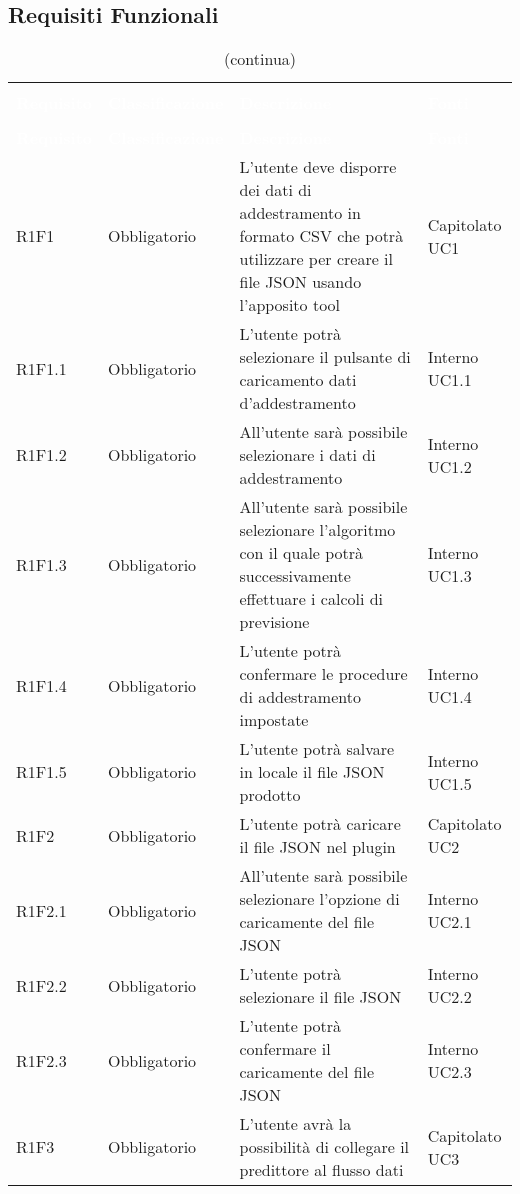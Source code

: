 \subsection{Requisiti Funzionali}
\begin{longtable}{C{3cm} C{3cm} L{5.5cm} C{3cm}}
\caption{Tabella dei requisiti funzionali} \\
\textcolor{white}{\textbf{Requisito}} &
\textcolor{white}{\textbf{Classificazione}} &
\textcolor{white}{\textbf{Descrizione}} &
\textcolor{white}{\textbf{Fonti}}  \\
		\endfirsthead
		\caption[]{(continua)} \\
\textcolor{white}{\textbf{Requisito}} &
\textcolor{white}{\textbf{Classificazione}} &
\textcolor{white}{\textbf{Descrizione}} &
\textcolor{white}{\textbf{Fonti}}  \\
		\endhead
R1F1 & Obbligatorio & L’utente deve disporre dei dati di addestramento in formato CSV che potrà utilizzare  per creare il file JSON usando l’apposito tool & Capitolato UC1\\
R1F1.1 & Obbligatorio & L’utente potrà selezionare il pulsante di caricamento dati d'addestramento &  Interno UC1.1\\
R1F1.2 & Obbligatorio & All’utente sarà possibile selezionare i dati di addestramento &  Interno UC1.2\\
R1F1.3 & Obbligatorio & All’utente sarà possibile selezionare l’algoritmo con il quale potrà successivamente effettuare i calcoli di previsione &  Interno UC1.3\\
R1F1.4 & Obbligatorio & L’utente potrà confermare le procedure di addestramento impostate &  Interno UC1.4\\
R1F1.5 & Obbligatorio & L’utente potrà salvare in locale il file JSON prodotto & Interno UC1.5\\
R1F2 & Obbligatorio & L’utente potrà caricare il file JSON nel plugin & Capitolato UC2\\
R1F2.1 & Obbligatorio & All’utente sarà possibile selezionare l’opzione di caricamente del file JSON &  Interno UC2.1\\
R1F2.2 & Obbligatorio & L’utente potrà selezionare il file JSON &  Interno UC2.2\\
R1F2.3 & Obbligatorio & L’utente potrà confermare il caricamente del file JSON &  Interno UC2.3\\
R1F3 & Obbligatorio & L’utente avrà la possibilità di collegare il predittore al flusso dati &  Capitolato UC3\\

\end{longtable}
